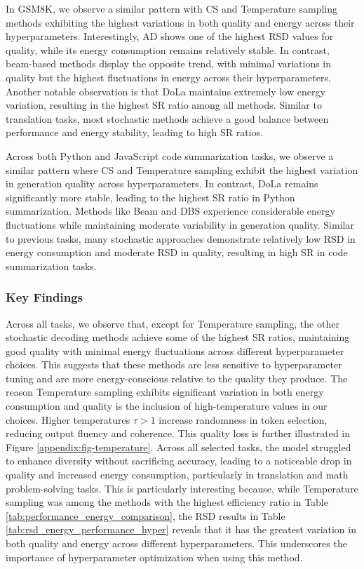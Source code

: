 In GSM8K, we observe a similar pattern with CS and Temperature sampling methods exhibiting the highest variations in both quality and energy across their hyperparameters. Interestingly, AD shows one of the highest RSD values for quality, while its energy consumption remains relatively stable. In contrast, beam-based methods display the opposite trend, with minimal variations in quality but the highest fluctuations in energy across their hyperparameters. Another notable observation is that DoLa maintains extremely low energy variation, resulting in the highest SR ratio among all methods. Similar to translation tasks, most stochastic methods achieve a good balance between performance and energy stability, leading to high SR ratios.     

Across both Python and JavaScript code summarization tasks, we observe a similar pattern where CS and Temperature sampling exhibit the highest variation in generation quality across hyperparameters. In contrast, DoLa remains significantly more stable, leading to the highest SR ratio in Python summarization. Methods like Beam and DBS experience considerable energy fluctuations while maintaining moderate variability in generation quality. Similar to previous tasks, many stochastic approaches demonstrate relatively low RSD in energy consumption and moderate RSD in quality, resulting in high SR in code summarization tasks.

\subsubsection{Key Findings}

Across all tasks, we observe that, except for Temperature sampling, the other stochastic decoding methods achieve some of the highest SR ratios, maintaining good quality with minimal energy fluctuations across different hyperparameter choices. This suggests that these methods are less sensitive to hyperparameter tuning and are more energy-conscious relative to the quality they produce. The reason Temperature sampling exhibits significant variation in both energy consumption and quality is the inclusion of high-temperature values in our choices. Higher temperatures \(\tau > 1\) increase randomness in token selection, reducing output fluency and coherence. This quality loss is further illustrated in Figure \ref{appendix:fig-temperature}. Across all selected tasks, the model struggled to enhance diversity without sacrificing accuracy, leading to a noticeable drop in quality and increased energy consumption, particularly in translation and math problem-solving tasks. This is particularly interesting because, while Temperature sampling was among the methods with the highest efficiency ratio in Table \ref{tab:performance_energy_comparison}, the RSD results in Table \ref{tab:rsd_energy_performance_hyper} reveals that it has the greatest variation in both quality and energy across different hyperparameters. This underscores the importance of hyperparameter optimization when using this method. 

